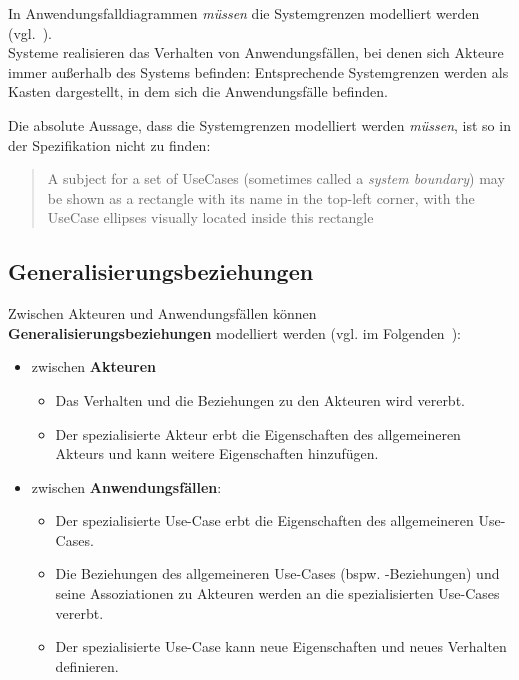 \noindent
In Anwendungsfalldiagrammen \textit{müssen} die Systemgrenzen modelliert werden (vgl.~\cite[52]{Buh09}).\\
Systeme realisieren das Verhalten von Anwendungsfällen, bei denen sich Akteure immer außerhalb des Systems befinden: Entsprechende Systemgrenzen werden als Kasten dargestellt, in dem sich  die Anwendungsfälle befinden.

\vspace{5mm}
\begin{tcolorbox}[title=Systemgrenzen,colback=red!20]
    Die absolute Aussage, dass die Systemgrenzen modelliert werden \textit{müssen}, ist so in der Spezifikation nicht zu finden:

    \blockquote[{\cite[18.1.4 Notation, 641, HErvorhebung i.O.]{OMG17}}]{
        A subject for a set of UseCases (sometimes called a \textit{system boundary}) may be shown as a rectangle with its name in the
        top-left corner, with the UseCase ellipses visually located inside this rectangle
    }
\end{tcolorbox}

\vspace{5mm}

\subsection{Generalisierungsbeziehungen}
Zwischen Akteuren und Anwendungsfällen können \textbf{Generalisierungsbeziehungen} modelliert werden (vgl. im Folgenden~\cite[66]{Bal05}):

\begin{itemize}
    \item zwischen \textbf{Akteuren}
    \begin{itemize}
        \item Das Verhalten und die Beziehungen zu den Akteuren wird vererbt.
        \item Der spezialisierte Akteur erbt die Eigenschaften des allgemeineren Akteurs und kann weitere Eigenschaften hinzufügen.
    \end{itemize}
    \item zwischen \textbf{Anwendungsfällen}:
    \begin{itemize}
        \item Der spezialisierte Use-Case erbt die Eigenschaften des allgemeineren Use-Cases.
        \item Die Beziehungen des allgemeineren Use-Cases (bspw. -Beziehungen) und seine Assoziationen zu Akteuren werden an die spezialisierten Use-Cases vererbt.
        \item Der spezialisierte Use-Case kann neue Eigenschaften und neues Verhalten definieren.
    \end{itemize}
\end{itemize}

